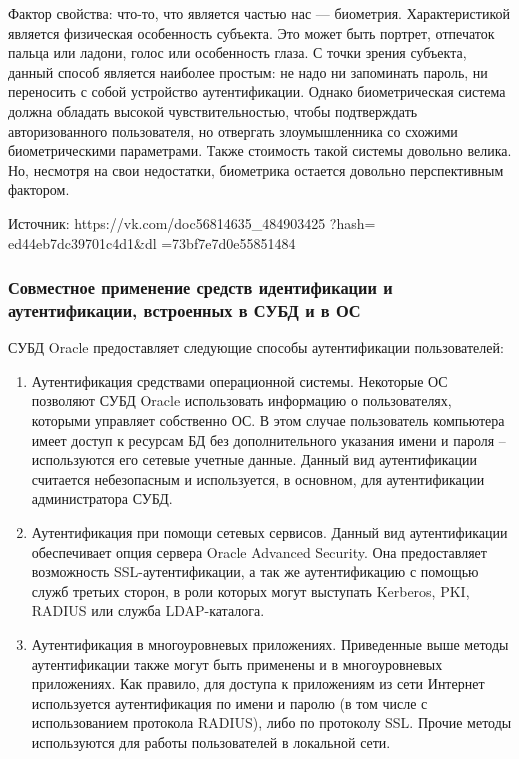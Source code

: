 Фактор свойства: что-то, что является частью нас — биометрия. Характеристикой является физическая особенность субъекта. Это может быть портрет, отпечаток пальца или ладони, голос или особенность глаза. С точки зрения субъекта, данный способ является наиболее простым: не надо ни запоминать пароль, ни переносить с собой устройство аутентификации. Однако биометрическая система должна обладать высокой чувствительностью, чтобы подтверждать авторизованного пользователя, но отвергать злоумышленника со схожими биометрическими параметрами. Также стоимость такой системы довольно велика. Но, несмотря на свои недостатки, биометрика остается довольно перспективным фактором.

Источник: https://vk.com/doc56814635\_484903425
?hash=
ed44eb7dc39701c4d1&dl
=73bf7e7d0e55851484

\subsubsection{Совместное применение средств идентификации и аутентификации, встроенных в СУБД и в ОС}
СУБД Oracle предоставляет следующие способы аутентификации
пользователей:
\begin{enumerate}
    \item Аутентификация средствами операционной системы. Некоторые ОС
позволяют СУБД Oracle использовать информацию о пользователях, которыми
управляет собственно ОС. В этом случае пользователь компьютера имеет доступ к
ресурсам БД без дополнительного указания имени и пароля – используются его
сетевые учетные данные. Данный вид аутентификации считается небезопасным и
используется, в основном, для аутентификации администратора СУБД.
    \item Аутентификация при помощи сетевых сервисов. Данный вид аутентификации
обеспечивает опция сервера Oracle Advanced Security. Она предоставляет
возможность SSL-аутентификации, а так же аутентификацию с помощью служб
третьих сторон, в роли которых могут выступать Kerberos, PKI, RADIUS или служба
LDAP-каталога.
    \item Аутентификация в многоуровневых приложениях. Приведенные выше
методы аутентификации также могут быть применены и в многоуровневых
приложениях. Как правило, для доступа к приложениям из сети Интернет используется аутентификация по имени и паролю (в том числе с использованием протокола
RADIUS), либо по протоколу SSL. Прочие методы используются для работы
пользователей в локальной сети.
\end{enumerate}


